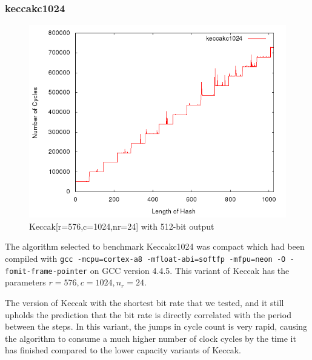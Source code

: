 \subsubsection{keccakc1024}
\begin{figure}[H]
    \begin{center}
        \includegraphics[scale=0.5]{images/keccakc1024.png} 
        \caption{Keccak[r=576,c=1024,nr=24] with 512-bit output}
    \end{center}
\end{figure}

The algorithm selected to benchmark Keccakc1024 was compact which had been
compiled with \texttt{gcc -mcpu=cortex-a8 -mfloat-abi=softfp -mfpu=neon -O
-fomit-frame-pointer} on GCC version 4.4.5. This variant of Keccak has the
parameters $r=576,c=1024,n_r=24$.

The version of Keccak with the shortest bit rate that we tested, and it still
upholds the prediction that the bit rate is directly correlated with the period
between the steps. In this variant, the jumps in cycle count is very rapid,
causing the algorithm to consume a much higher number of clock cycles by the
time it has finished compared to the lower capacity variants of Keccak.
